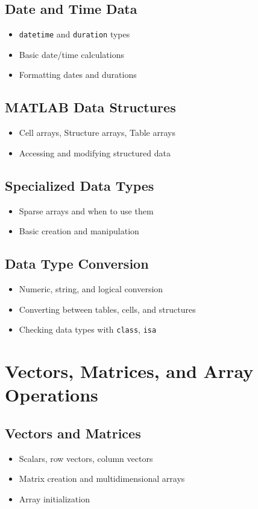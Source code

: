 \documentclass[11pt, a4paper]{article}
\begin{document}
\subsection{Date and Time Data}
\begin{itemize}
  \item \texttt{datetime} and \texttt{duration} types
  \item Basic date/time calculations
  \item Formatting dates and durations
\end{itemize}

\subsection{MATLAB Data Structures}
\begin{itemize}
  \item Cell arrays, Structure arrays, Table arrays
  \item Accessing and modifying structured data
\end{itemize}

\subsection{Specialized Data Types}
\begin{itemize}
  \item Sparse arrays and when to use them
  \item Basic creation and manipulation
\end{itemize}

\subsection{Data Type Conversion}
\begin{itemize}
  \item Numeric, string, and logical conversion
  \item Converting between tables, cells, and structures
  \item Checking data types with \texttt{class}, \texttt{isa}
\end{itemize}

\section{Vectors, Matrices, and Array Operations}

\subsection{Vectors and Matrices}
\begin{itemize}
  \item Scalars, row vectors, column vectors
  \item Matrix creation and multidimensional arrays
  \item Array initialization
\end{itemize}
\end{document}
